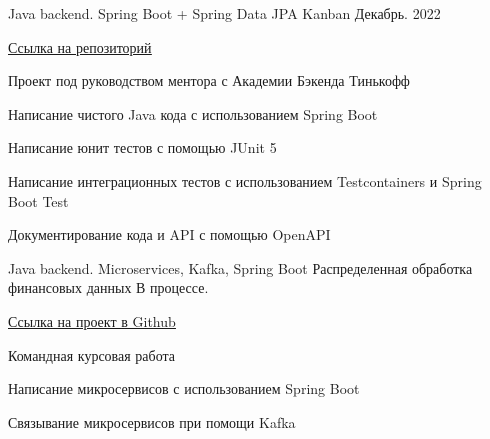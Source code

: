 

\begin{cventries}

  \cventry
    {Java backend. Spring Boot + Spring Data JPA} %
    {Kanban} %
    {} %
    {Декабрь. 2022} %
    {
      \begin{cvitems} %
        \item {\href{https://gitlab.com/KutuzovDmitry/kanban}{\underline{Ссылка на репозиторий}}}
        \item {Проект под руководством ментора с Академии Бэкенда Тинькофф}
        \item {Написание чистого Java кода с использованием Spring Boot}
        \item {Написание юнит тестов с помощью JUnit 5}
        \item {Написание интеграционных тестов с использованием Testcontainers и Spring Boot Test}
        \item {Документирование кода и API с помощью OpenAPI}
      \end{cvitems}
    }

  \cventry
    {Java backend. Microservices, Kafka, Spring Boot} %
    {Распределенная обработка финансовых данных} %
    {} %
    {В процессе.} %
    {
      \begin{cvitems} %
      \item{\href{https://github.com/HSECourseWork2022}{\underline{Ссылка на проект в Github}}}
        \item {Командная курсовая работа}
        \item {Написание микросервисов с использованием Spring Boot}
        \item {Связывание микросервисов при помощи Kafka}
      \end{cvitems}
    }

\end{cventries}
